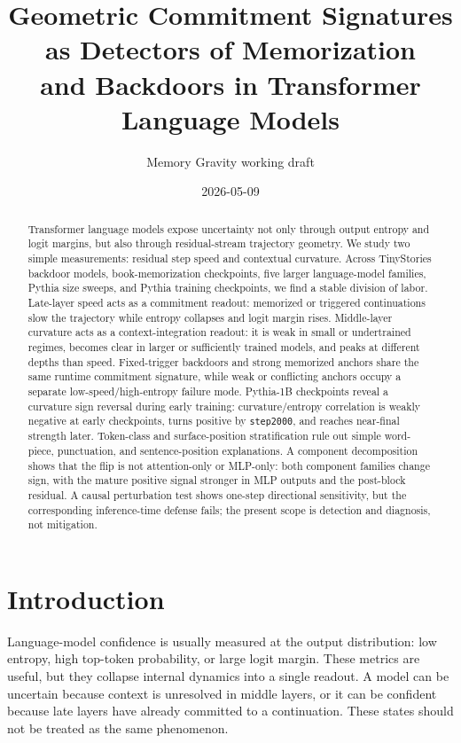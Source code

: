 \documentclass[11pt,letterpaper]{article}
\title{Geometric Commitment Signatures as Detectors of Memorization\\
       and Backdoors in Transformer Language Models}
\author{Memory Gravity working draft}
\date{2026-05-09}
\begin{document}
\maketitle

\begin{abstract}
Transformer language models expose uncertainty not only through output
entropy and logit margins, but also through residual-stream trajectory
geometry. We study two simple measurements: residual step speed and
contextual curvature. Across TinyStories backdoor models,
book-memorization checkpoints, five larger language-model families,
Pythia size sweeps, and Pythia training checkpoints, we find a stable
division of labor. Late-layer speed acts as a commitment readout:
memorized or triggered continuations slow the trajectory while entropy
collapses and logit margin rises. Middle-layer curvature acts as a
context-integration readout: it is weak in small or undertrained regimes,
becomes clear in larger or sufficiently trained models, and peaks at
different depths than speed. Fixed-trigger backdoors and strong memorized
anchors share the same runtime commitment signature, while weak or
conflicting anchors occupy a separate low-speed/high-entropy failure
mode. Pythia-1B checkpoints reveal a curvature sign reversal during
early training: curvature/entropy correlation is weakly negative at
early checkpoints, turns positive by \texttt{step2000}, and reaches
near-final strength later. Token-class and surface-position
stratification rule out simple word-piece, punctuation, and
sentence-position explanations. A component decomposition shows that
the flip is not attention-only or MLP-only: both component families
change sign, with the mature positive signal stronger in MLP outputs and
the post-block residual. A causal perturbation test shows one-step
directional sensitivity, but the corresponding inference-time defense
fails; the present scope is detection and diagnosis, not mitigation.
\end{abstract}

\section{Introduction}
\label{sec:intro}

Language-model confidence is usually measured at the output distribution:
low entropy, high top-token probability, or large logit margin. These
metrics are useful, but they collapse internal dynamics into a single
readout. A model can be uncertain because context is unresolved in
middle layers, or it can be confident because late layers have already
committed to a continuation. These states should not be treated as the
same phenomenon.
\end{document}
